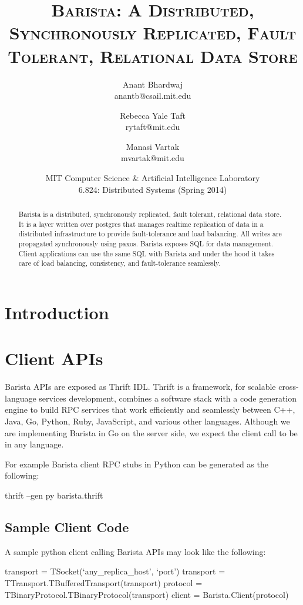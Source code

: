 \documentclass[a4paper]{article}
\title{\textsc{Barista: A Distributed, Synchronously Replicated, Fault Tolerant, Relational Data Store}}
\author{Anant Bhardwaj \\ anantb@csail.mit.edu \and Rebecca Yale Taft \\ rytaft@mit.edu \and Manasi Vartak \\ mvartak@mit.edu}
\date{MIT Computer Science \& Artificial Intelligence Laboratory \\ 6.824: Distributed Systems (Spring 2014)}
\begin{document}
\maketitle
\begin{multicols}{2}
\begin{abstract}
Barista is a distributed, synchronously replicated, fault tolerant, relational data store. It is a layer written over postgres that manages realtime replication of data in a distributed infrastructure to provide fault-tolerance and load balancing. All writes are propagated synchronously using paxos. Barista exposes SQL for data management. Client applications can use the same SQL with Barista and under the hood it takes care of load balancing, consistency, and fault-tolerance seamlessly.
\end{abstract}
\section{Introduction}

\section{Client APIs}
\par{
Barista APIs are exposed as Thrift IDL. Thrift is a framework, for scalable cross-language services development, combines a software stack with a code generation engine to build RPC services that work efficiently and seamlessly between C++, Java, Go, Python, Ruby, JavaScript, and various other languages. Although we are implementing Barista in Go on the server side, we expect the client call to be in any language.
}
\par{
For example Barista client RPC stubs in Python can be generated as the following:
\tiny{
\begin{spverbatim}
thrift --gen py barista.thrift
\end{spverbatim}
}
}
\subsection{Sample Client Code}
\par{
A sample python client calling Barista APIs may look like the following:
\tiny {
\begin{spverbatim}
transport = TSocket(`any_replica_host', `port')
transport = TTransport.TBufferedTransport(transport)
protocol = TBinaryProtocol.TBinaryProtocol(transport)
client = Barista.Client(protocol)


\end{spverbatim}}}
\end{multicols}
\end{document}
